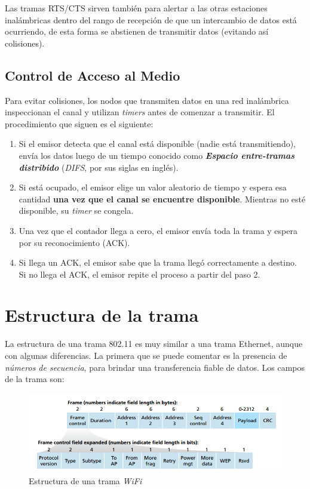 Las tramas RTS/CTS sirven también para alertar a las otras estaciones inalámbricas dentro del rango de recepción de que un intercambio de datos está ocurriendo, de esta forma se abstienen de transmitir datos (evitando así colisiones).

\subsection{Control de Acceso al Medio}

Para evitar colisiones, los nodos que transmiten datos en una red inalámbrica inspeccionan el canal y utilizan \emph{timers} antes de comenzar a transmitir. El procedimiento que siguen es el siguiente:

\begin{enumerate}
    \item Si el emisor detecta que el canal está disponible (nadie está transmitiendo), envía los datos luego de un tiempo conocido como \emph{\textbf{Espacio entre-tramas distribido}} (\emph{DIFS}, por sus siglas en inglés).
    \item Si está ocupado, el emisor elige un valor aleatorio de tiempo y espera esa cantidad \textbf{una vez que el canal se encuentre disponible}. Mientras no esté disponible, su \emph{timer} se congela.
    \item Una vez que el contador llega a cero, el emisor envía toda la trama y espera por su reconocimiento (ACK).
    \item Si llega un ACK, el emisor sabe que la trama llegó correctamente a destino. Si no llega el ACK, el emisor repite el proceso a partir del paso 2.
\end{enumerate}

\section{Estructura de la trama}

La estructura de una trama 802.11 es muy similar a una trama Ethernet, aunque con algunas diferencias. La primera que se puede comentar es la presencia de \emph{números de secuencia}, para brindar una transferencia fiable de datos. Los campos de la trama son:

\begin{figure}[H]
    \centering
    \includegraphics[width=\linewidth]{images/trama-wifi.png}
    \caption{Estructura de una trama \emph{WiFi} \autocite{Kurose:Wireless}}
\end{figure}

